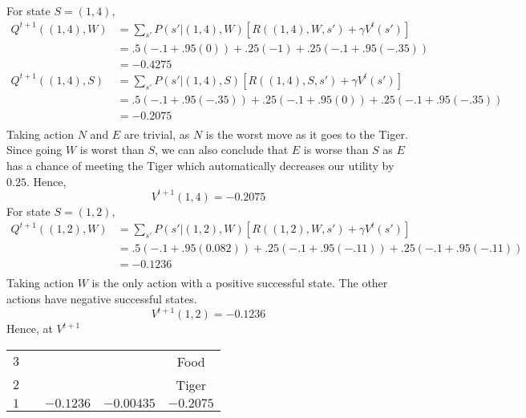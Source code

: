 \begin{enumerate}
$$        $$
        For state $S=(1,4)$,
        \begin{align*}
          Q^{t+1}((1,4), W) & =\sum_{s'}P(s'\vert (1,4), W)[R((1,4), W, s') + \gamma V^t(s')] \\
                            & =.5(-.1 + .95(0)) + .25(-1) + .25(-.1 + .95(-.35))              \\
                            & = -0.4275                                                       \\
          Q^{t+1}((1,4), S) & =\sum_{s'}P(s'\vert (1,4), S)[R((1,4), S, s') + \gamma V^t(s')] \\
                            & =.5(-.1 + .95(-.35)) + .25(-.1 + .95(0)) + .25(-.1 + .95(-.35)) \\
                            & = -0.2075                                                       \\
        \end{align*}
        Taking action $N$ and $E$ are trivial, as $N$ is the worst move as it goes to the Tiger. Since going $W$ is worst than $S$, we can also conclude that $E$ is worse than $S$ as $E$ has a chance of meeting the Tiger which automatically decreases our utility by $0.25$. Hence,
        $$
          V^{t+1}(1,4)= -0.2075
        $$
        For state $S=(1,2)$,
        \begin{align*}
          Q^{t+1}((1,2), W) & =\sum_{s'}P(s'\vert (1,2), W)[R((1,2), W, s') + \gamma V^t(s')]     \\
                            & =.5(-.1 + .95(0.082)) + .25(-.1 + .95(-.11)) + .25(-.1 + .95(-.11)) \\
                            & = -0.1236                                                           \\
        \end{align*}
        Taking action $W$ is the only action with a positive successful state. The other actions have negative successful states.
        $$
          V^{t+1}(1,2)= -0.1236
        $$
        Hence, at $V^{t+1}$
        \begin{center}
          \bgroup
          \def\arraystretch{1.5}%
          \begin{tabular}{|c|c|c|c|c|}
            \hline
            $3$ &     &                      &            & Food      \\
            $2$ &     & \cellcolor[gray]{.1} &            & Tiger     \\
            $1$ &     & $-0.1236$            & $-0.00435$ & $-0.2075$ \\

\end{tabular}
\end{center}
\end{enumerate}
